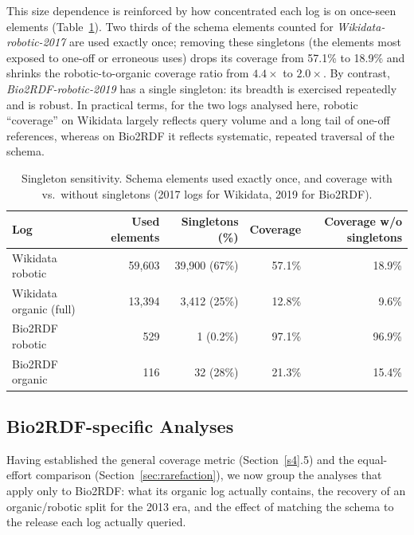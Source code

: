 \documentclass[sw]{iosart2x}
\begin{document}
This size dependence is reinforced by how concentrated each log is on once-seen elements (Table~\ref{tab:singletons}). Two thirds of the schema elements counted for \emph{Wikidata-robotic-2017} are used exactly once; removing these singletons (the elements most exposed to one-off or erroneous uses) drops its coverage from 57.1\% to 18.9\% and shrinks the robotic-to-organic coverage ratio from $4.4\times$ to $2.0\times$. By contrast, \emph{Bio2RDF-robotic-2019} has a single singleton: its breadth is exercised repeatedly and is robust. In practical terms, for the two logs analysed here, robotic ``coverage'' on Wikidata largely reflects query volume and a long tail of one-off references, whereas on Bio2RDF it reflects systematic, repeated traversal of the schema. 



\begin{table}[ht]
\centering
\caption{Singleton sensitivity. Schema elements used exactly once, and coverage with vs.\ without singletons (2017 logs for Wikidata, 2019 for Bio2RDF).}
\label{tab:singletons}
\begin{tabular}{l|r|r|r|r}
\hline
Log & Used elements & Singletons (\%) & Coverage & Coverage w/o singletons \\
\hline
Wikidata robotic & 59,603 & 39,900 (67\%) & 57.1\% & 18.9\% \\
Wikidata organic (full) & 13,394 & 3,412 (25\%) & 12.8\% & 9.6\% \\
Bio2RDF robotic & 529 & 1 (0.2\%) & 97.1\% & 96.9\% \\
Bio2RDF organic & 116 & 32 (28\%) & 21.3\% & 15.4\% \\
\hline
\end{tabular}
\end{table}

\subsection{Bio2RDF-specific Analyses}\label{sec:bio2rdfresults}
Having established the general coverage metric (Section~\ref{s4}.5) and the equal-effort comparison (Section~\ref{sec:rarefaction}), we now group the analyses that apply only to Bio2RDF: what its organic log actually contains, the recovery of an organic/robotic split for the 2013 era, and the effect of matching the schema to the release each log actually queried.
\end{document}

